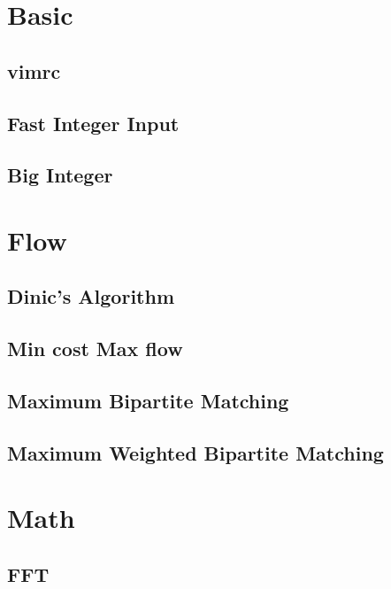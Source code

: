 \documentclass[a4paper,10pt,twocolumn,oneside]{article}
\begin{document}
\pagestyle{fancy}
\fancyfoot{}
\fancyhead[R]{\thepage}
\renewcommand{\headrulewidth}{0.4pt}
\renewcommand{\contentsname}{Contents} 
\scriptsize
\tableofcontents
\newpage
\section{Basic}
\subsection{vimrc}

\subsection{Fast Integer Input}

\subsection{Big Integer}

\section{Flow}
\subsection{Dinic's Algorithm}

\subsection{Min cost Max flow}

\subsection{Maximum Bipartite Matching}

\subsection{Maximum Weighted Bipartite Matching}

\section{Math}
\subsection{FFT}

\end{document}
